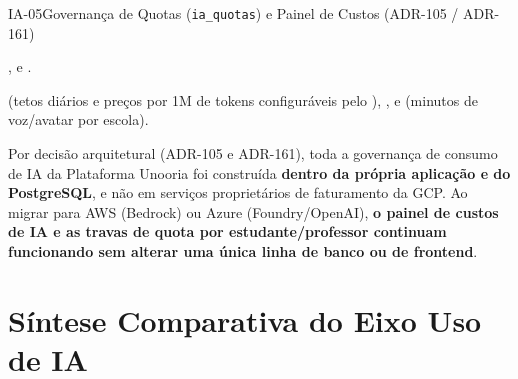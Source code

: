 \begin{pecaarq}{IA-05}{Governança de Quotas (\texttt{ia\_quotas}) e Painel de Custos (ADR-105 / ADR-161)}{\sgcp~\nativo\enspace\saws~\nativo\enspace\sazure~\nativo}
\begin{campos}
  \item[Código na API] ,  e .
  \item[Tabelas PostgreSQL]  (tetos diários e preços por 1M de tokens configuráveis pelo ), ,  e  (minutos de voz/avatar por escola).
  \item[Portabilidade] Por decisão arquitetural (ADR-105 e ADR-161), toda a governança de consumo de IA da Plataforma Unooria foi construída \textbf{dentro da própria aplicação e do PostgreSQL}, e não em serviços proprietários de faturamento da GCP. Ao migrar para AWS (Bedrock) ou Azure (Foundry/OpenAI), \textbf{o painel de custos de IA e as travas de quota por estudante/professor continuam funcionando sem alterar uma única linha de banco ou de frontend}.
\end{campos}
\end{pecaarq}

\section{Síntese Comparativa do Eixo Uso de IA}

